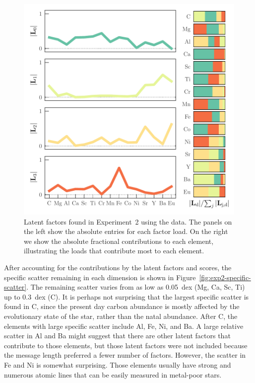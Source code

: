 \documentclass[twocolumn]{aastex62}
\begin{document}
\begin{figure}
	\includegraphics[width=\textwidth]{experiments/exp2-log-xfe-offset-latent-factors-visualize-abs.pdf}
	\caption{Latent factors found in Experiment~2 using the \citet{Barklem:2005}
			 data. The panels on the left show the absolute entries for each factor load. 
			 On the right we show the absolute fractional contributions to
			 each element, illustrating the loads that contribute most to each element.}
    \label{fig:exp2-factor-loads}
\end{figure}



After accounting for the contributions by the latent factors and scores,
the specific scatter remaining in each dimension is shown in
Figure~\ref{fig:exp2-specific-scatter}. The remaining scatter varies from as low 
as 0.05~dex (Mg, Ca, Sc, Ti) up to 0.3~dex (C). It is perhaps not surprising that
the largest specific scatter is found in C, since the present day carbon abundance
is mostly affected by the evolutionary state of the star, rather than the natal
abundance. After C, the elements with large specific scatter include Al, Fe, Ni, 
and Ba. A large relative scatter in Al and Ba might suggest that there are other latent
factors that contribute to those elements, but those latent factors were not included because
the message length preferred a fewer number of factors. However, the scatter in 
Fe and Ni is somewhat surprising. Those elements usually have strong and numerous atomic
lines that can be easily measured in metal-poor stars. 
\end{document}
